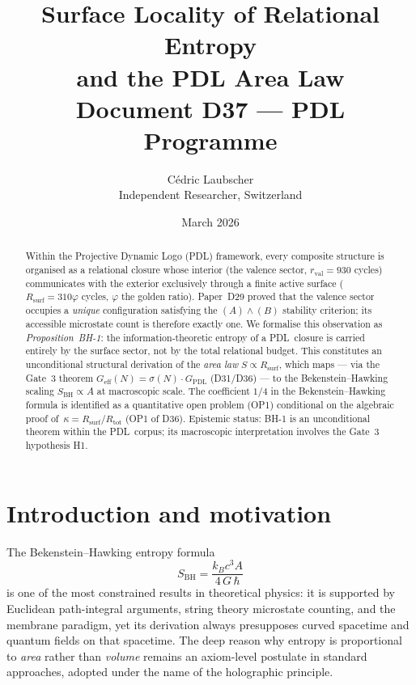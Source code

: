 \documentclass[11pt,a4paper]{article}
\title{\textbf{Surface Locality of Relational Entropy\\
and the PDL Area Law}\\[4pt]
\large Document D37 --- PDL Programme}
\author{C\'edric Laubscher\\
\small Independent Researcher, Switzerland}
\date{March 2026}
\theoremstyle{plain}
\theoremstyle{definition}
\theoremstyle{remark}
\newcommand{\PDL}{\textsc{PDL}}
\newcommand{\rval}{r_{\mathrm{val}}}
\newcommand{\Rtot}{R_{\mathrm{tot}}}
\newcommand{\Rsurf}{R_{\mathrm{surf}}}
\newcommand{\vp}{\varphi}
\newcommand{\kap}{\kappa}
\newcommand{\sig}{\sigma}
\newcommand{\GPDL}{G_{\mathrm{PDL}}}
\newcommand{\Geff}{G_{\mathrm{eff}}}
\newcommand{\hb}{\hbar}
\newcommand{\SBH}{S_{\mathrm{BH}}}
\begin{document}
\maketitle

\begin{abstract}
Within the Projective Dynamic Logo (\PDL) framework, every composite structure is
organised as a relational closure whose interior (the valence sector, $\rval = 930$
cycles) communicates with the exterior exclusively through a finite active surface
($\Rsurf = 310\vp$ cycles, $\vp$ the golden ratio). Paper~D29 proved that the valence
sector occupies a \emph{unique} configuration satisfying the $(A)\wedge(B)$ stability
criterion; its accessible microstate count is therefore exactly one.
We formalise this observation as \emph{Proposition~BH-1}: the information-theoretic
entropy of a \PDL\ closure is carried entirely by the surface sector, not by the
total relational budget. This constitutes an unconditional structural derivation of the
\emph{area law} $S \propto \Rsurf$, which maps --- via the Gate~3 theorem
$\Geff(N)=\sig(N)\cdot\GPDL$ (D31/D36) --- to the Bekenstein--Hawking scaling
$\SBH \propto A$ at macroscopic scale. The coefficient $1/4$ in the Bekenstein--Hawking
formula is identified as a quantitative open problem (OP1) conditional on the algebraic
proof of~$\kap = \Rsurf/\Rtot$ (OP1 of D36). Epistemic status: BH-1 is an unconditional
theorem within the \PDL\ corpus; its macroscopic interpretation involves the Gate~3
hypothesis H1.
\end{abstract}

\newpage

\tableofcontents

\newpage

\section{Introduction and motivation}
\label{sec:intro}

The Bekenstein--Hawking entropy formula
\begin{equation}
  \SBH = \frac{k_B c^3 A}{4\,G\,\hb}
  \label{eq:BH}
\end{equation}
is one of the most constrained results in theoretical physics: it is supported by
Euclidean path-integral arguments, string theory microstate counting, and the
membrane paradigm, yet its derivation always presupposes curved spacetime and quantum
fields on that spacetime. The deep reason why entropy is proportional to \emph{area}
rather than \emph{volume} remains an axiom-level postulate in standard approaches,
adopted under the name of the holographic principle.
\end{document}
